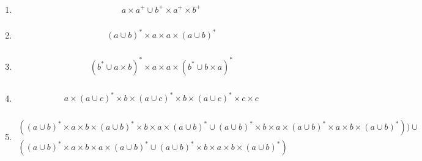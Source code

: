 \begin{question}
   \begin{enumerate}[label=\alph*)]
   		\item 
   		\begin{align*}
   			a \times a^{+} \cup b^{+} \times a^{+} \times b^{+}  \\
   		\end{align*}
   		
   		\item 
   	   \begin{align*}
   			( a \cup b)^{*} \times a \times a \times ( a \cup b)^{*}  \\
   		\end{align*}
   		
   		\item 
   	   \begin{align*}
   			( b^{*} \cup a \times b)^{*} \times a \times a \times ( b^{*} \cup b \times a)^{*}  \\
   		\end{align*}
   		
   		\item 
   		\begin{align*}
   			a \times ( a \cup c)^{*} \times b \times ( a \cup c)^{*} \times b \times ( a \cup c )^{*} \times c \times c  \\
   		\end{align*}
   		
   		\item 
   		\begin{align*}
   			((a \cup b )^{*} \times a \times b \times (a \cup b )^{*} \times b \times a \times (a \cup b)^{*} \cup (a \cup b)^{*} \times b \times a \times (a \cup b)^{*} \times a \times b \times (a \cup b)^{*})) \cup \\
   			((a \cup b)^{*} \times a \times b \times a \times (a \cup b)^{*} \cup (a \cup b)^{*} \times b \times a \times b \times (a \cup b)^{*})
   		\end{align*}


\end{enumerate}
\end{question}
